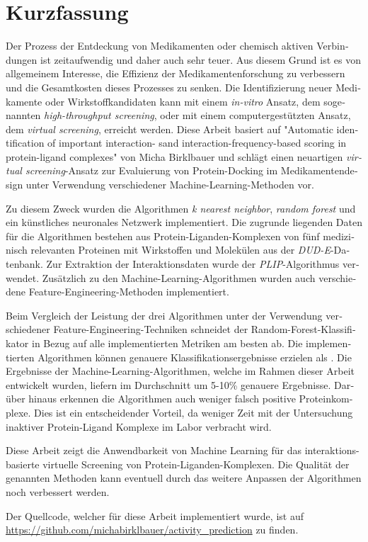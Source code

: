\chapter{Kurzfassung}

\begin{german}
Der Prozess der Entdeckung von Medikamenten oder chemisch aktiven Verbindungen ist zeitaufwendig
und daher auch sehr teuer. Aus diesem Grund ist es von allgemeinem Interesse, die Effizienz der
Medikamentenforschung zu verbessern und die Gesamtkosten dieses Prozesses zu senken. Die Identifizierung
neuer Medikamente oder Wirkstoffkandidaten kann mit einem \textit{in-vitro} Ansatz, dem sogenannten \textit{high-throughput screening},
oder mit einem computergestützten Ansatz, dem \textit{virtual screening}, erreicht werden. Diese Arbeit basiert auf
"Automatic identification of important interaction-
sand interaction-frequency-based scoring in protein-ligand complexes"
von Micha Birklbauer\cite[]{Birklbauer2021} und schlägt einen neuartigen \textit{virtual screening}-Ansatz
zur Evaluierung von Protein-Docking im Medikamentendesign unter Verwendung verschiedener Machine-Learning-Methoden vor.

Zu diesem Zweck wurden die Algorithmen \textit{k nearest neighbor}, \textit{random forest} und ein künstliches neuronales Netzwerk implementiert.
Die zugrunde liegenden Daten für die Algorithmen bestehen aus Protein-Liganden-Komplexen von fünf medizinisch relevanten Proteinen mit Wirkstoffen 
und Molekülen aus der \textit{DUD-E}-Datenbank\cite[]{Mysinger2012}. Zur Extraktion der Interaktionsdaten wurde der \textit{PLIP}-Algorithmus\cite[]{Salentin2015} verwendet.
Zusätzlich zu den Machine-Learning-Algorithmen wurden auch verschiedene Feature-Engineering-Methoden implementiert.

Beim Vergleich der Leistung der drei Algorithmen unter der Verwendung verschiedener Feature-Engineering-Techniken
schneidet der Random-Forest-Klassifikator in Bezug auf alle implementierten Metriken am besten ab.
Die implementierten Algorithmen können genauere Klassifikationsergebnisse erzielen als \cite[]{Birklbauer2021}.
Die Ergebnisse der Machine-Learning-Algorithmen, welche im Rahmen dieser Arbeit entwickelt wurden, liefern im Durchschnitt
um 5-10\% genauere Ergebnisse. Darüber hinaus erkennen die Algorithmen auch weniger falsch positive Proteinkomplexe.
Dies ist ein entscheidender Vorteil, da weniger Zeit mit der Untersuchung inaktiver Protein-Ligand Komplexe
im Labor verbracht wird.

Diese Arbeit zeigt die Anwendbarkeit von Machine Learning für das interaktions-basierte virtuelle Screening von Protein-Liganden-Komplexen.
Die Qualität der genannten Methoden
kann eventuell durch das weitere Anpassen der Algorithmen noch verbessert werden.

Der Quellcode, welcher für diese Arbeit implementiert wurde, ist auf \\\href{https://github.com/michabirklbauer/activity_prediction}{https://github.com/michabirklbauer/activity\_prediction} 
zu finden.
\end{german}
